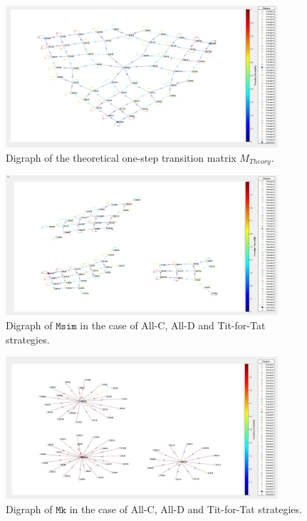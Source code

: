 \documentclass[12pt]{article}
\begin{document}
\begin{figure}
    \centering
    \includegraphics[width=0.9\textwidth]{media/10.jpg}
    \caption{Digraph of the theoretical one-step transition matrix $M_{Theory}$.}
    \label{fig:myimage}
\end{figure}

\begin{figure}
    \centering
    \includegraphics[width=0.9\textwidth]{media/11.jpg}
    \caption{Digraph of $\texttt{Msim}$ in the case of All-C, All-D and Tit-for-Tat strategies.}
    \label{fig:myimage}
\end{figure}

\begin{figure}
    \centering
    \includegraphics[width=0.9\textwidth]{media/12.jpg}
    \caption{Digraph of $\texttt{Mk}$ in the case of All-C, All-D and Tit-for-Tat strategies.}
    \label{fig:myimage}
\end{figure}
\end{document}
